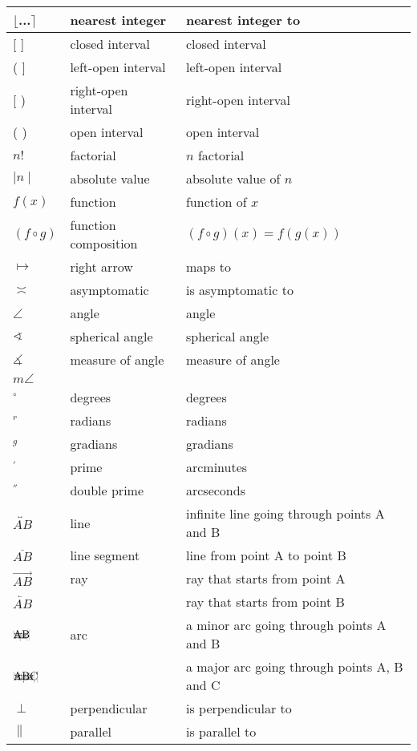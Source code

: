 \documentclass{article}
\newcommand{\arc}[1]{{\setbox9=\hbox{#1}\ooalign{\resizebox{\wd9}{\height}{\texttoptiebar{\phantom{A}}}\cr#1}}}
\begin{document}
\begin{longtable}{|| L{1.7cm} | L{3.5cm} | L{7cm} ||}
\hline
\(\lfloor\)...\(\rceil\) & nearest integer & nearest integer to\\
\hline
{[} {]} & closed interval & closed interval\\
( {]} & left-open interval & left-open interval\\
{[} ) & right-open interval & right-open interval\\
( ) & open interval & open interval\\
\hline
\({n}!\) & factorial & \(n\) factorial\\
\hline
\(\mid{n}\mid\) & absolute value & absolute value of \(n\)\\
\hline
\({f(x)}\) & function & function of \(x\)\\
\hline
\({(f\circ g)}\) & function composition & \({(f\circ g)}(x) = {f(g(x))}\)\\
\hline
\(\mapsto\) & right arrow & maps to\\
\hline
\(\asymp\) & asymptomatic & is asymptomatic to\\
\hline
\(\angle\) & angle & angle\\
\hline
\(\sphericalangle\) & spherical angle & spherical angle\\
\hline
\(\measuredangle\) & measure of angle & measure of angle\\
\({m\angle}\) & &\\
\hline
\(^{\circ}\) & degrees & degrees\\
\hline
\(^{r}\) & radians & radians\\
\hline
\(^{g}\) & gradians & gradians\\
\hline
\(^{'}\) & prime & arcminutes\\
\hline
\(^{''}\) & double prime & arcseconds\\
\hline
\(\overleftrightarrow{AB}\) & line & infinite line going through points A and B\\
\hline
\(\overline{AB}\) & line segment & line from point A to point B\\
\hline
\(\overrightarrow{AB}\) & ray & ray that starts from point A\\
\(\overleftarrow{AB}\) & & ray that starts from point B\\
\hline
\(\arc{AB}\) & arc &a  minor arc going through points A and B\\
\(\arc{ABC}\) & & a major arc going through points A, B and C\\
\hline
\(\perp\) & perpendicular & is perpendicular to\\
\hline
\(\parallel\) & parallel & is parallel to\\

\end{longtable}
\end{document}
